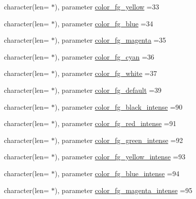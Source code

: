 \begin{DoxyCompactItemize}
\item 
character(len= $\ast$), parameter \mbox{\hyperlink{namespacem__escape_accc5b67f05d8a2b02ca6f4a0ba38e581}{color\+\_\+fg\+\_\+yellow}} =\textquotesingle{}33\textquotesingle{}
\item 
character(len= $\ast$), parameter \mbox{\hyperlink{namespacem__escape_a01075e619c6af06aac80d73f32263439}{color\+\_\+fg\+\_\+blue}} =\textquotesingle{}34\textquotesingle{}
\item 
character(len= $\ast$), parameter \mbox{\hyperlink{namespacem__escape_ac56b264a4d6c5f3668bac32b791e54de}{color\+\_\+fg\+\_\+magenta}} =\textquotesingle{}35\textquotesingle{}
\item 
character(len= $\ast$), parameter \mbox{\hyperlink{namespacem__escape_a0bbc85c7110c9b67456884baafe31daf}{color\+\_\+fg\+\_\+cyan}} =\textquotesingle{}36\textquotesingle{}
\item 
character(len= $\ast$), parameter \mbox{\hyperlink{namespacem__escape_ae410339e5c6b5468a65e8ce193941ea4}{color\+\_\+fg\+\_\+white}} =\textquotesingle{}37\textquotesingle{}
\item 
character(len= $\ast$), parameter \mbox{\hyperlink{namespacem__escape_aaeff9968bb1e29198469d5d8109e5f41}{color\+\_\+fg\+\_\+default}} =\textquotesingle{}39\textquotesingle{}
\item 
character(len= $\ast$), parameter \mbox{\hyperlink{namespacem__escape_a75d8856bae4a4b8875d48ce2e3a3409a}{color\+\_\+fg\+\_\+black\+\_\+intense}} =\textquotesingle{}90\textquotesingle{}
\item 
character(len= $\ast$), parameter \mbox{\hyperlink{namespacem__escape_a9355532fa2ee17b47e72208480a86707}{color\+\_\+fg\+\_\+red\+\_\+intense}} =\textquotesingle{}91\textquotesingle{}
\item 
character(len= $\ast$), parameter \mbox{\hyperlink{namespacem__escape_a21c7f9b0377ba62dc353e09c05cc5f35}{color\+\_\+fg\+\_\+green\+\_\+intense}} =\textquotesingle{}92\textquotesingle{}
\item 
character(len= $\ast$), parameter \mbox{\hyperlink{namespacem__escape_a7fb2b231cf28bd2ffbf015d7430b46db}{color\+\_\+fg\+\_\+yellow\+\_\+intense}} =\textquotesingle{}93\textquotesingle{}
\item 
character(len= $\ast$), parameter \mbox{\hyperlink{namespacem__escape_a57cc52b1beef27fae861cae6448221fe}{color\+\_\+fg\+\_\+blue\+\_\+intense}} =\textquotesingle{}94\textquotesingle{}
\item 
character(len= $\ast$), parameter \mbox{\hyperlink{namespacem__escape_ac47d36c6fed693f69eff29d0046c8f20}{color\+\_\+fg\+\_\+magenta\+\_\+intense}} =\textquotesingle{}95\textquotesingle{}

\end{DoxyCompactItemize}
